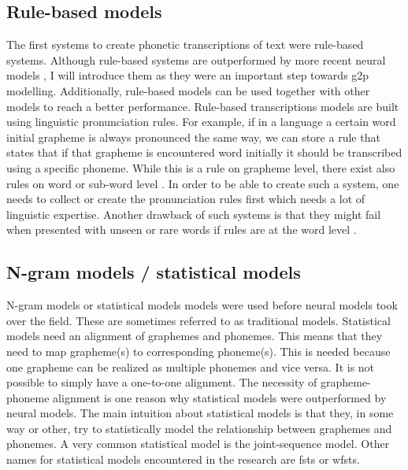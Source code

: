 \subsection{Rule-based models}
The first systems to create phonetic transcriptions of text were rule-based systems. Although rule-based systems are outperformed by more recent neural models \citep{Ashby-Bartley.2021, gorman-etal-2020-sigmorphon}, I will introduce them as they were an important step towards \ac{g2p} modelling. Additionally, rule-based models can be used together with other models to reach a better performance. Rule-based transcriptions models are built using linguistic pronunciation rules. For example, if in a language a certain word initial grapheme is always pronounced the same way, we can store a rule that states that if that grapheme is encountered word initially it should be transcribed using a specific phoneme. While this is a rule on grapheme level, there exist also rules on word or sub-word level \citep{mortensen-etal-2018-epitran}. In order to be able to create such a system, one needs to collect or create the pronunciation rules first which needs a lot of linguistic expertise. Another drawback of such systems is that they might fail when presented with unseen or rare words if rules are at the word level \citep{ney-joint-sequence2008}.

\subsection{N-gram models / statistical models}
N-gram models or statistical models models were used before neural models took over the field. These are sometimes referred to as traditional models. Statistical models need an alignment of graphemes and phonemes. This means that they need to map grapheme(s) to corresponding phoneme(s). This is needed because one grapheme can be realized as multiple phonemes and vice versa. It is not possible to simply have a one-to-one alignment. The necessity of grapheme-phoneme alignment is one reason why statistical models were outperformed by neural models. The main intuition about statistical models is that they, in some way or other, try to statistically model the relationship between graphemes and phonemes. A very common statistical model is the joint-sequence model. Other names for statistical models encountered in the research are \acp{fst} or \acp{wfst}.

